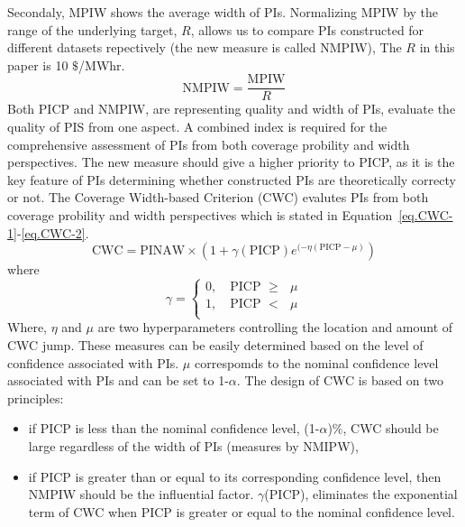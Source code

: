 \documentclass[review]{elsarticle}
\begin{document}
        Secondaly, MPIW shows the average width of PIs.
        Normalizing MPIW by the range of the underlying target, $R$, allows us to compare PIs constructed for different datasets repectively (the new measure is called NMPIW),
        The $R$ in this paper is 10 $\$$/MWhr.
        \begin{equation}
          \text{NMPIW} = \frac{\text{MPIW}}{R}
          \label{eq.NMPIW}
        \end{equation}
        Both PICP and NMPIW, are representing quality and width of PIs, evaluate the quality of PIS from one aspect.
        A combined index is required for the comprehensive assessment of PIs from both coverage probility and width perspectives.
        The new measure should give a higher priority to PICP, as it is the key feature of PIs determining whether constructed PIs are theoretically correcty or not.
        The Coverage Width-based Criterion (CWC) evalutes PIs from both coverage probility and width perspectives which is stated in Equation~\ref{eq.CWC-1}-\ref{eq.CWC-2}.
        \begin{equation}
          \text{CWC}=\text{PINAW} \times (1+\gamma(\text{PICP})e^{(-\eta(\text{PICP}-\mu)})
          \label{eq.CWC-1}
        \end{equation}
        where
        \begin{equation}
          \gamma =
                \begin{cases}
                  0, \quad \text{PICP $\geq$ $\mu$} \\
                  1, \quad \text{PICP $<$ $\mu$} \\
                \end{cases}
          \label{eq.CWC-2}
        \end{equation}
        Where, $\eta$ and $\mu$ are two hyperparameters controlling the location and amount of CWC jump.
        These measures can be easily determined based on the level of confidence associated with PIs.
        $\mu$ correspomds to the nominal confidence level associated with PIs and can be set to 1-$\alpha$.
        The design of CWC is based on two principles:

        \begin{itemize}
          \item if PICP is less than the nominal confidence level, (1-$\alpha$)$\%$, CWC should be large regardless of the width of PIs (measures by NMIPW),
          \item if PICP is greater than or equal to its corresponding confidence level, then NMPIW should be the influential factor.
          $\gamma$(PICP), eliminates the exponential term of CWC when PICP is greater or equal to the nominal confidence level.
        \end{itemize}
\end{document}
